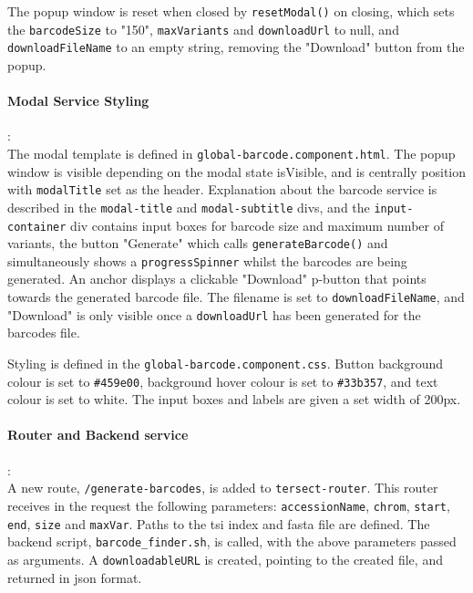 \documentclass[12pt]{article}
\begin{document}
\begin{itemize}
The popup window is reset when closed by \verb+resetModal()+ on closing, which sets the \verb+barcodeSize+ to "150", \verb+maxVariants+ and \verb+downloadUrl+ to null, and \verb+downloadFileName+ to an empty string, removing the "Download" button from the popup.  

\paragraph{Modal Service Styling}:\\
The modal template is defined in \verb+global-barcode.component.html+. The popup window is visible depending on the modal state isVisible, and is centrally position with \verb+modalTitle+ set as the header. Explanation about the barcode service is described in the \verb+modal-title+ and \verb+modal-subtitle+ divs, and the \verb+input-container+ div contains input boxes for barcode size and maximum number of variants, the button "Generate" which calls \verb+generateBarcode()+ and simultaneously shows a \verb+progressSpinner+ whilst the barcodes are being generated. An anchor displays a clickable "Download" p-button that points towards the generated barcode file. The filename is set to \verb+downloadFileName+, and "Download" is only visible once a \verb+downloadUrl+ has been generated for the barcodes file.  

Styling is defined in the \verb+global-barcode.component.css+. Button background colour is set to \verb+#459e00+, background hover colour is set to \verb+#33b357+, and text colour is set to white. The input boxes and labels are given a set width of 200px. 

\paragraph{Router and Backend service}:\\
A new route, \verb+/generate-barcodes+, is added to \verb+tersect-router+. This router receives in the request the following parameters: \verb+accessionName+, \verb+chrom+, \verb+start+, \verb+end+, \verb+size+ and \verb+maxVar+. Paths to the tsi index and fasta file are defined. The backend script, \verb+barcode_finder.sh+, is called, with the above parameters passed as arguments. A \verb+downloadableURL+ is created, pointing to the created file, and returned in json format.  


\end{itemize}
\end{document}
